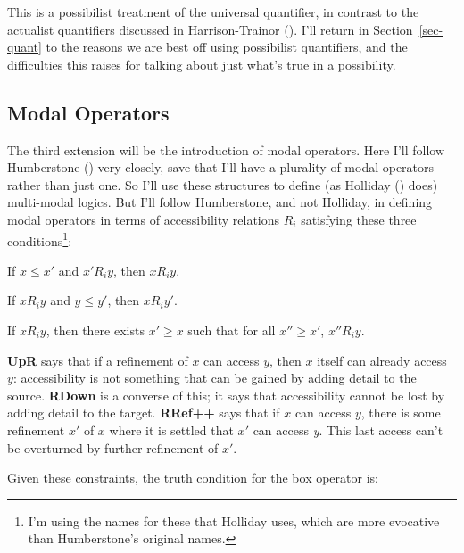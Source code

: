 \documentclass[
  11pt,
  letterpaper,
  DIV=11,
  numbers=noendperiod,
  twoside]{scrartcl}
\providecommand{\tightlist}{%
  \setlength{\itemsep}{0pt}\setlength{\parskip}{0pt}}
\begin{document}
This is a possibilist treatment of the universal quantifier, in contrast
to the actualist quantifiers discussed in Harrison-Trainor
(). I'll return in
Section~\ref{sec-quant} to the reasons we are best off using possibilist
quantifiers, and the difficulties this raises for talking about just
what's true in a possibility.

\subsection*{Modal Operators}\label{modal-operators}

The third extension will be the introduction of modal operators. Here
I'll follow Humberstone () very
closely, save that I'll have a plurality of modal operators rather than
just one. So I'll use these structures to define (as Holliday
() does) multi-modal logics. But I'll
follow Humberstone, and not Holliday, in defining modal operators in
terms of accessibility relations \(R_i\) satisfying these three
conditions\footnote{I'm using the names for these that Holliday uses,
  which are more evocative than Humberstone's original names.}:

\begin{description}
\tightlist
\item[\textbf{UpR}:]
If \(x \leqslant x'\) and \(x' R_i y\), then \(x R_i y\).
\item[\textbf{RDown}:]
If \(x R_i y\) and \(y \leqslant y'\), then \(x R_i y'\).
\item[\textbf{RRef++}:]
If \(x R_i y\), then there exists \(x' \geqslant x\) such that for all
\(x'' \geqslant x'\), \(x'' R_i y\).
\end{description}

\textbf{UpR} says that if a refinement of \(x\) can access \(y\), then
\(x\) itself can already access \(y\): accessibility is not something
that can be gained by adding detail to the source. \textbf{RDown} is a
converse of this; it says that accessibility cannot be lost by adding
detail to the target. \textbf{RRef++} says that if \(x\) can access
\(y\), there is some refinement \(x'\) of \(x\) where it is settled that
\(x'\) can access \emph{y}. This last access can't be overturned by
further refinement of \(x'\).

Given these constraints, the truth condition for the box operator is:
\end{document}
